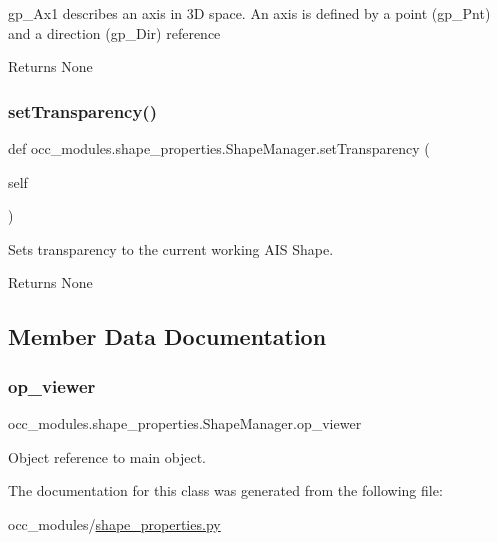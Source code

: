 gp\+\_\+\+Ax1 describes an axis in 3D space. An axis is defined by a point (gp\+\_\+\+Pnt) and a direction (gp\+\_\+\+Dir) reference

\begin{DoxyReturn}{Returns}
None 
\end{DoxyReturn}
\hypertarget{a00094_a8d7fdd0bde28afe34d3793c8bcf060fa}{}\label{a00094_a8d7fdd0bde28afe34d3793c8bcf060fa} 
\subsubsection{\texorpdfstring{set\+Transparency()}{setTransparency()}}
{\footnotesize\ttfamily def occ\+\_\+modules.\+shape\+\_\+properties.\+Shape\+Manager.\+set\+Transparency (\begin{DoxyParamCaption}\item[{}]{self }\end{DoxyParamCaption})}



Sets transparency to the current working A\+IS Shape. 

\begin{DoxyReturn}{Returns}
None 
\end{DoxyReturn}


\subsection{Member Data Documentation}
\hypertarget{a00094_ad60197d66a3c059f30f32c2ab1a12841}{}\label{a00094_ad60197d66a3c059f30f32c2ab1a12841} 
\subsubsection{\texorpdfstring{op\+\_\+viewer}{op\_viewer}}
{\footnotesize\ttfamily occ\+\_\+modules.\+shape\+\_\+properties.\+Shape\+Manager.\+op\+\_\+viewer}



Object reference to main object. 



The documentation for this class was generated from the following file\+:\begin{DoxyCompactItemize}
\item 
occ\+\_\+modules/\hyperlink{a00023}{shape\+\_\+properties.\+py}\end{DoxyCompactItemize}
